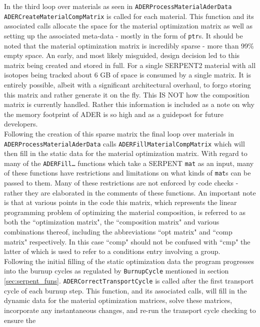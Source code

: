 In the third loop over materials as seen in \texttt{ADERProcessMaterialAderData}
\texttt{ADERCreateMaterialCompMatrix} is called for each material. This function
and its associated calls allocate the space for the material optimization matrix
as well as setting up the associated meta-data - mostly in the form of
\texttt{ptr}s. It should be noted that the material optimization matrix is
incredibly sparse - more than 99\% empty space. An early, and most likely
misguided, design decision led to this matrix being created and stored in full.
For a single SERPENT2 material with all isotopes being tracked about 6 GB of
space is consumed by a single matrix. It is entirely possible, albeit with a
significant architectural overhaul, to forgo storing this matrix and rather
generate it on the fly. This IS NOT how the composition matrix is currently
handled. Rather this information is included as a note on why the memory
footprint of ADER is so high and as a guidepost for future developers.\\
Following the creation of this sparse matrix the final loop over materials in
\texttt{ADERProcessMaterialAderData} calls \texttt{ADERFillMaterialCompMatrix}
which will then fill in the static data for the material optimization matrix.
With regard to many of the \texttt{ADERFill\ldots} functions which take
a SERPENT \texttt{mat} as an input, many of these functions have restrictions
and limitations on what kinds of \texttt{mat}s can be passed to them. Many of
these restrictions are not enforced by code checks - rather they are elaborated
in the comments of these functions. 
An important note is that at various points in the code this matrix, which
represents the linear programming problem of optimizing the material
composition, is referred to as both the ``optimization matrix", the
``composition matrix" and various combinations thereof, including the
abbreviations ``opt matrix" and ``comp matrix" respectively. In this case
``comp" should not be confused with ``cmp" the latter of which is used to
refer to a conditions entry involving a group. \\
Following the initial filling of the static optimization data the program
progresses into the burnup cycles as regulated by \texttt{BurnupCycle} mentioned
in section \ref{sec:serpent_funs}. \texttt{ADERCorrectTransportCycle} is called
after the first transport cycle of each burnup step. This function, and
its associated calls, will fill in the dynamic data for the material
optimization matrices, solve these matrices, incorporate any instantaneous
changes, and re-run the transport cycle checking to ensure the 
